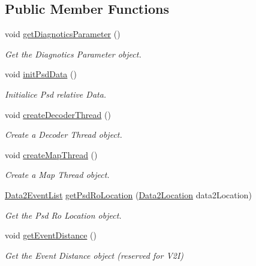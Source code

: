 \subsection*{Public Member Functions}
\begin{DoxyCompactItemize}
\item 
void \hyperlink{class_psd_location_adf19a491291327b33c1101deb91fe64f}{get\+Diagnotics\+Parameter} ()
\begin{DoxyCompactList}\small\item\em Get the Diagnotics Parameter object. \end{DoxyCompactList}\item 
void \hyperlink{class_psd_location_a4ea349a64cd856f29a26d93f520fc38f}{init\+Psd\+Data} ()
\begin{DoxyCompactList}\small\item\em Initialice Psd relative Data. \end{DoxyCompactList}\item 
void \hyperlink{class_psd_location_a99798cafd2c4257230d9b74215325da0}{create\+Decoder\+Thread} ()
\begin{DoxyCompactList}\small\item\em Create a Decoder Thread object. \end{DoxyCompactList}\item 
void \hyperlink{class_psd_location_a5a7754d385e2b97c9b1e154e02dc0686}{create\+Map\+Thread} ()
\begin{DoxyCompactList}\small\item\em Create a Map Thread object. \end{DoxyCompactList}\item 
\hyperlink{_psd_location_8h_a61af0449f917913c902b37ed397eb350}{Data2\+Event\+List} \hyperlink{class_psd_location_a5bb3ffaeee69beeece9175c0b8bdf491}{get\+Psd\+Ro\+Location} (\hyperlink{_psd_location_8h_a1e3a92020005d2a81aa50ba5ae9b129c}{Data2\+Location} data2\+Location)
\begin{DoxyCompactList}\small\item\em Get the Psd Ro Location object. \end{DoxyCompactList}\item 
void \hyperlink{class_psd_location_acb88267ba5337c7d06687b3121930bc0}{get\+Event\+Distance} ()
\begin{DoxyCompactList}\small\item\em Get the Event Distance object (reserved for V2I) \end{DoxyCompactList}\item 

\end{DoxyCompactItemize}
